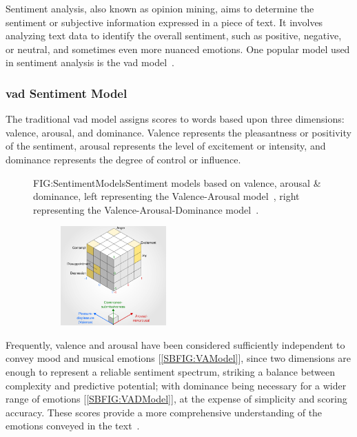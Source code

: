 Sentiment analysis, also known as opinion mining, aims to determine the sentiment or subjective information expressed in a piece of text. It involves analyzing text data to identify the overall sentiment, such as positive, negative, or neutral, and sometimes even more nuanced emotions. One popular model used in sentiment analysis is the \ac{vad} model~\cite{VAD-MODEL}.

\subsubsection{\acs{vad} Sentiment Model}

The traditional \acs{vad} model assigns scores to words based upon three dimensions: valence, arousal, and dominance. Valence represents the pleasantness or positivity of the sentiment, arousal represents the level of excitement or intensity, and dominance represents the degree of control or influence.

\begin{figure}[Valence-Arousal-Dominance sentiment models]{FIG:SentimentModels}{Sentiment models based on valence, arousal \& dominance, left representing the Valence-Arousal model~\cite{WIKI:VA-MODEL}, right representing the Valence-Arousal-Dominance model~\cite{WIKI:PAD-MODEL}.}
    \begin{subfigure}[SBFIG:VAModel]{Circumplex Valence-Arousal model}{}
    \end{subfigure}
    \begin{subfigure}[SBFIG:VADModel]{Three-dimensional Valence-Arousal-Dominance model}{\includegraphics[width=0.445\textwidth]{img/VADModel.png}}
    \end{subfigure}
\end{figure}

Frequently, valence and arousal have been considered sufficiently independent to convey mood and musical emotions [\ref{SBFIG:VAModel}], since two dimensions are enough to represent a reliable sentiment spectrum, striking a balance between complexity and predictive potential; with dominance being necessary for a wider range of emotions [\ref{SBFIG:VADModel}], at the expense of simplicity and scoring accuracy. These scores provide a more comprehensive understanding of the emotions conveyed in the text~\cite{EMOTION-MODELS}.

